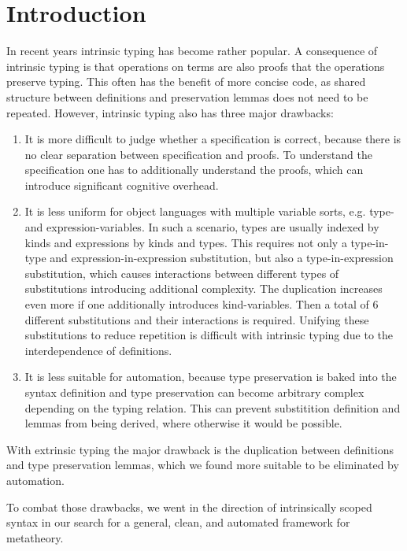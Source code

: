 \documentclass[sigplan,10pt, anonymous]{acmart}
\begin{document}
  \section{Introduction}
  \label{sec:introduction}
  In recent years intrinsic typing\cite{TODO} has become rather popular.
  A consequence of intrinsic typing is that operations on terms
  are also proofs that the operations preserve typing.
  This often has the benefit of more concise code, as shared structure
  between definitions and preservation lemmas does not need to be
  repeated.
  However, intrinsic typing also has three major drawbacks:
  \begin{enumerate}
  \item
    It is more difficult to judge whether a specification is correct,
    because there is no clear separation between specification and proofs.
    To understand the specification one has to additionally
    understand the proofs, which can introduce significant cognitive overhead.
  \item
    It is less uniform for object languages with multiple variable
    sorts, e.g. type- and expression-variables. In such a scenario,
    types are usually indexed by kinds and expressions by kinds and types.
    This requires not only a type-in-type and expression-in-expression
    substitution, but also a type-in-expression substitution, which causes
    interactions between different types of substitutions introducing
    additional complexity.
    The duplication increases even more if one additionally introduces
    kind-variables. Then a total of 6 different substitutions and
    their interactions is required.
    Unifying these substitutions to reduce repetition is difficult
    with intrinsic typing due to the interdependence of definitions.
  \item
    It is less suitable for automation, because type preservation is baked
    into the syntax definition and type preservation can become arbitrary complex
    depending on the typing relation. This can prevent substitition
    definition and lemmas from being derived, where otherwise it would be possible.
  \end{enumerate}
  With extrinsic typing the major drawback is the duplication between
  definitions and type preservation lemmas, which we found more
  suitable to be eliminated by automation.

  To combat those drawbacks, we went in the direction of intrinsically
  scoped syntax in our search for a general, clean, and automated framework
  for metatheory.
\end{document}
